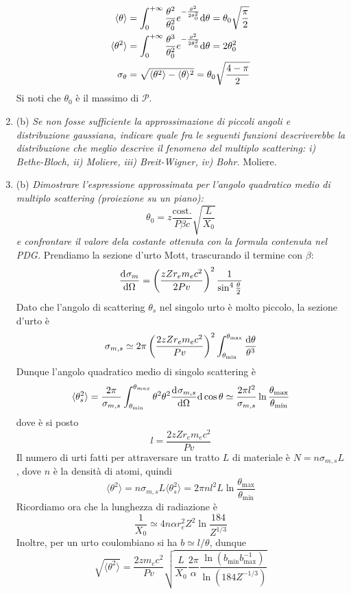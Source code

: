 \documentclass{article}
\renewcommand{\b}{(b)}
\renewcommand{\t}[1]{\textit{ #1}}
\begin{document}
\begin{enumerate}
		\begin{align*}
			\langle\theta\rangle&=\int_{0}^{+\infty}\frac{\theta^2}{\theta_0^2}e^{-\frac{\theta^2}{2\theta_0^2}}\mathrm{d} \theta=\theta_0\sqrt{\frac{\pi}{2}}\\\langle\theta^2\rangle&=\int_{0}^{+\infty}\frac{\theta^3}{\theta_0^2}e^{-\frac{\theta^2}{2\theta_0^2}}\mathrm{d} \theta=2\theta_0^2\\\sigma_\theta&=\sqrt{\langle\theta^2\rangle-\langle\theta\rangle^2}=\theta_0\sqrt{\frac{4-\pi}{2}}
		\end{align*}
	Si noti che $\theta_0$ è il massimo di $\mathcal{P}$.
	\item\b\t{Se non fosse sufficiente la approssimazione di piccoli angoli e distribuzione
		gaussiana, indicare quale fra le seguenti funzioni descriverebbe la distribuzione 
		che meglio descrive il fenomeno del multiplo scattering: i) Bethe-Bloch, ii)
		Moliere, iii) Breit-Wigner, iv) Bohr.} Moliere.
	\item\b\t{Dimostrare l'espressione approssimata per l’angolo quadratico medio di multiplo
		scattering (proiezione su un piano): \[\theta_0=z\frac{\mathrm{cost.}}{P\beta c}\sqrt{\frac{L}{X_0}}\]
		e confrontare il valore dela
		costante ottenuta con la formula contenuta nel PDG.}
	Prendiamo la sezione d'urto Mott, trascurando il termine con $\beta$:
	\[\dfrac{\mathrm{d} ^{}\sigma_m}{\mathrm{d} {\Omega}^{}}=\left(\frac{zZr_em_ec^2}{2Pv}\right)^2\frac{1}{\sin^4\frac{\theta}{2}}\]
	Dato che l'angolo di scattering $\theta_s$ nel singolo urto è molto piccolo, la sezione d'urto è
	\[\sigma_{m,s}\simeq2\pi\left(\frac{2zZr_em_ec^2}{Pv}\right)^2\int_{\theta_\textrm{min}}^{\theta_\textrm{max}}\frac{\mathrm{d} \theta}{\theta^3}\]
	Dunque l'angolo quadratico medio di singolo scattering è
	\[\langle\theta^2_s\rangle=\frac{2\pi}{\sigma_{m,s}}\int_{\theta_\textrm{min}}^{\theta_{max}}\theta^2\theta^2\dfrac{\mathrm{d} ^{}\sigma_{m,s}}{\mathrm{d} {\Omega}^{}}\mathrm{d} \cos\theta\simeq\frac{2\pi l^2}{\sigma_{m,s}}\ln\frac{\theta_\textrm{max}}{\theta_\textrm{min}}\]
	dove è si posto
	\[l=\frac{2zZr_em_ec^2}{Pv}\]
	Il numero di urti fatti per attraversare un tratto $L$ di materiale è $N=n\sigma_{m,s}L$, dove $n$ è la densità di atomi, quindi
	\[\langle\theta^2\rangle=n\sigma_{m,s}L\langle\theta^2_s\rangle=2\pi nl^2L\ln\frac{\theta_\textrm{max}}{\theta_\textrm{min}}\]
	Ricordiamo ora che la lunghezza di radiazione è
	\[\frac{1}{X_0}\simeq4n\alpha r_e^2Z^2\ln\frac{184}{Z^{1/3}}\]
	Inoltre, per un urto coulombiano si ha $b\simeq l/\theta$, dunque
	\[\sqrt{\langle\theta^2\rangle}=\frac{2zm_ec^2}{Pv}\sqrt{\frac{L}{X_0}\frac{2\pi}{\alpha}\frac{\ln(b_\textrm{min}b^{-1}_\textrm{max})}{\ln(184Z^{-1/3})}}\]

\end{enumerate}
\end{document}
